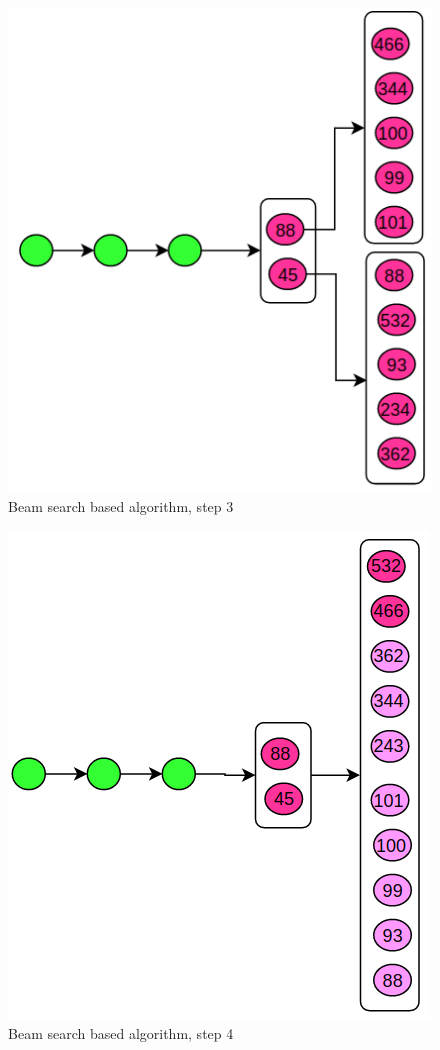 \begin{figure}[!ht]
	\begin{center}  
		\includegraphics[scale=0.4]{beam-algo-3.png}
		\caption{Beam search based algorithm, step 3}
		\label{figure:beam3}	
	\end{center}
\end{figure}

\begin{figure}[!ht]
	\begin{center}  
		\includegraphics[scale=0.4]{beam-algo-4.png}
		\caption{Beam search based algorithm, step 4}
		\label{figure:beam4}	
	\end{center}
\end{figure}

